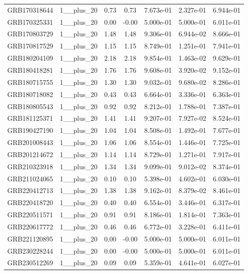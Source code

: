\documentclass[12pt]{article}
\begin{document}
\begin{table}[h!]
{\begin{tabular}{l c c c c c c}
GRB170318644 & 1__plus_20 & 0.73 & 0.73 & 7.673e-01 & 2.327e-01 & 6.944e-01 \\
GRB170325331 & 1__plus_20 & 0.00 & -0.00 & 5.000e-01 & 5.000e-01 & 6.011e-01 \\
GRB170803729 & 1__plus_20 & 1.48 & 1.48 & 9.306e-01 & 6.944e-02 & 8.666e-01 \\
GRB170817529 & 1__plus_20 & 1.15 & 1.15 & 8.749e-01 & 1.251e-01 & 7.941e-01 \\
GRB180204109 & 1__plus_20 & 2.18 & 2.18 & 9.854e-01 & 1.463e-02 & 9.629e-01 \\
GRB180418281 & 1__plus_20 & 1.76 & 1.76 & 9.608e-01 & 3.920e-02 & 9.152e-01 \\
GRB180715755 & 1__plus_20 & 1.30 & 1.30 & 9.032e-01 & 9.680e-02 & 8.286e-01 \\
GRB180718082 & 1__plus_20 & 0.43 & 0.43 & 6.664e-01 & 3.336e-01 & 6.363e-01 \\
GRB180805543 & 1__plus_20 & 0.92 & 0.92 & 8.212e-01 & 1.788e-01 & 7.387e-01 \\
GRB181125371 & 1__plus_20 & 1.41 & 1.41 & 9.207e-01 & 7.927e-02 & 8.524e-01 \\
GRB190427190 & 1__plus_20 & 1.04 & 1.04 & 8.508e-01 & 1.492e-01 & 7.677e-01 \\
GRB201008443 & 1__plus_20 & 1.06 & 1.06 & 8.554e-01 & 1.446e-01 & 7.725e-01 \\
GRB201214672 & 1__plus_20 & 1.14 & 1.14 & 8.729e-01 & 1.271e-01 & 7.917e-01 \\
GRB210323918 & 1__plus_20 & 1.34 & 1.34 & 9.099e-01 & 9.012e-02 & 8.374e-01 \\
GRB211024065 & 1__plus_20 & 0.10 & 0.10 & 5.398e-01 & 4.602e-01 & 6.030e-01 \\
GRB220412713 & 1__plus_20 & 1.38 & 1.38 & 9.162e-01 & 8.379e-02 & 8.461e-01 \\
GRB220418720 & 1__plus_20 & 0.40 & 0.40 & 6.554e-01 & 3.446e-01 & 6.317e-01 \\
GRB220511571 & 1__plus_20 & 0.91 & 0.91 & 8.186e-01 & 1.814e-01 & 7.363e-01 \\
GRB220617772 & 1__plus_20 & 0.46 & 0.46 & 6.772e-01 & 3.228e-01 & 6.411e-01 \\
GRB221120895 & 1__plus_20 & 0.00 & -0.00 & 5.000e-01 & 5.000e-01 & 6.011e-01 \\
GRB230228244 & 1__plus_20 & 0.00 & -0.00 & 5.000e-01 & 5.000e-01 & 6.011e-01 \\
GRB230512269 & 1__plus_20 & 0.09 & 0.09 & 5.359e-01 & 4.641e-01 & 6.027e-01 \\

\end{tabular}}
\end{table}
\end{document}
